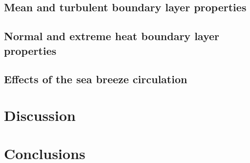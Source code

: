 \documentclass[11pt,a4paper]{article}
\begin{document}
\subsection{Mean and turbulent boundary layer properties}

\subsection{Normal and extreme heat boundary layer properties}

\subsection{Effects of the sea breeze circulation}

\section{Discussion}

\section{Conclusions}

\printbibliography
\end{document}
